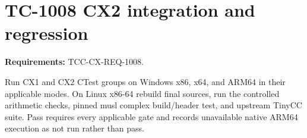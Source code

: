 \documentclass{article}
\begin{document}
\section*{TC-1008 CX2 integration and regression}
\textbf{Requirements:} TCC-CX-REQ-1008.

Run CX1 and CX2 CTest groups on Windows x86, x64, and ARM64 in their applicable
modes. On Linux x86-64 rebuild final sources, run the controlled arithmetic
checks, pinned musl complex build/header test, and upstream TinyCC suite. Pass
requires every applicable gate and records unavailable native ARM64 execution
as not run rather than pass.
\end{document}
